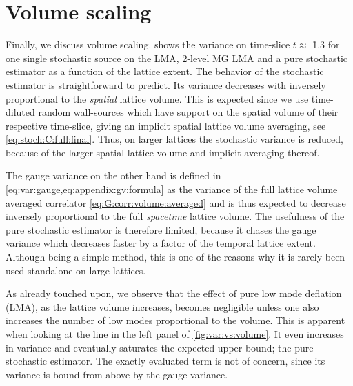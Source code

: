 
\section{Volume scaling}
\label{sec:numerics:volume:scaling}

Finally, we discuss volume scaling.
 shows the variance on time-slice $t \approx $ \u{1.3}{\femto \metre} for one single stochastic source on the LMA, 2-level MG LMA and a pure stochastic estimator as a function of the lattice extent.
The behavior of the stochastic estimator is straightforward to predict.
Its variance decreases with inversely proportional to the \textit{spatial} lattice volume.
This is expected since we use time-diluted random wall-sources which have support on the spatial volume of their respective time-slice, giving an implicit spatial lattice volume averaging, see \cref{eq:stoch:C:full:final}.
Thus, on larger lattices the stochastic variance is reduced, because of the larger spatial lattice volume and implicit averaging thereof.

The gauge variance on the other hand is defined in \cref{eq:var:gauge,eq:appendix:gv:formula} as the variance of the full lattice volume averaged correlator \cref{eq:G:corr:volume:averaged} and is thus expected to decrease inversely proportional to the full \textit{spacetime} lattice volume.
The usefulness of the pure stochastic estimator is therefore limited, because it chases the gauge variance which decreases faster by a factor of the temporal lattice extent.
Although being a simple method, this is one of the reasons why it is rarely been used standalone on large lattices.

As already touched upon, we observe that the effect of pure low mode deflation (LMA), as the lattice volume increases, becomes negligible unless one also increases the number of low modes proportional to the volume.
This is apparent when looking at the  line in the left panel of \cref{fig:var:vs:volume}.
It even increases in variance and eventually saturates the expected upper bound; the pure stochastic estimator.
The exactly evaluated  term is not of concern, since its variance is bound from above by the gauge variance.

